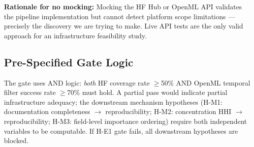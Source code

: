 \textbf{Rationale for no mocking:} Mocking the HF Hub or OpenML API validates the pipeline implementation but cannot detect platform scope limitations --- precisely the discovery we are trying to make. Live API tests are the only valid approach for an infrastructure feasibility study.

\subsection{Pre-Specified Gate Logic}

The gate uses AND logic: \emph{both} HF coverage rate $\geq$50\% AND OpenML temporal filter success rate $\geq$70\% must hold. A partial pass would indicate partial infrastructure adequacy; the downstream mechanism hypotheses (H-M1: documentation completeness $\to$ reproducibility; H-M2: concentration HHI $\to$ reproducibility; H-M3: field-level importance ordering) require both independent variables to be computable. If H-E1 gate fails, all downstream hypotheses are blocked.
